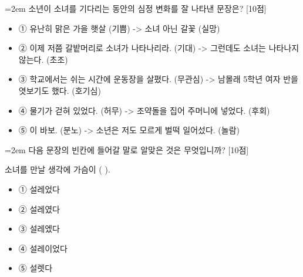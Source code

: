 \documentclass[12pt,a4paper]{article}
\newcommand{\qnum}[1]{%
  \tikz[baseline=(num.base)]{%
    \node[circle, fill=numCircle, text=white, inner sep=0pt,
          minimum size=18pt, font=\small\bfseries] (num) {#1};%
  }%
}
\newcommand{\pts}[1]{%
  \hfill\textcolor{ptsBadge}{[#1점]}%
}
\begin{document}
\vspace{4mm}
\begin{minipage}{\columnwidth}
{\hangindent=2em
\qnum{18}\enspace 소년이 소녀를 기다리는 동안의 심정 변화를 잘 나타낸 문장은? \pts{10}
\par}

\vspace{3mm}
\begin{itemize}[leftmargin=2.5em, labelsep=0.3em, label={}, itemsep=4pt, parsep=1pt, topsep=0pt]
  \item ① 유난히 맑은 가을 햇살 (기쁨) -> 소녀 아닌 갈꽃 (실망)
  \item ② 이제 저쯤 갈밭머리로 소녀가 나타나리라. (기대) -> 그런데도 소녀는 나타나지 않는다. (초조)
  \item ③ 학교에서는 쉬는 시간에 운동장을 살폈다. (무관심) -> 남몰래 5학년 여자 반을 엿보기도 했다. (호기심)
  \item ④ 물기가 걷혀 있었다. (허무) -> 조약돌을 집어 주머니에 넣었다. (후회)
  \item ⑤ 이 바보. (분노) -> 소년은 저도 모르게 벌떡 일어섰다. (놀람)
\end{itemize}
\end{minipage}
\vspace{4mm}

\vspace{4mm}
\begin{minipage}{\columnwidth}
{\hangindent=2em
\qnum{19}\enspace 다음 문장의 빈칸에 들어갈 말로 알맞은 것은 무엇입니까? \pts{10}
\par}

\vspace{3mm}
\begin{tcolorbox}[bogi]
소녀를 만날 생각에 가슴이 (          ).
\end{tcolorbox}
\vspace{3mm}
\begin{itemize}[leftmargin=2.5em, labelsep=0.3em, label={}, itemsep=4pt, parsep=1pt, topsep=0pt]
  \item ① 설레었다
  \item ② 설레였다
  \item ③ 설레엤다
  \item ④ 설레이었다
  \item ⑤ 설렛다
\end{itemize}
\end{minipage}
\vspace{4mm}
\end{document}
